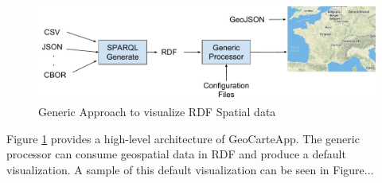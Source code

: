 \documentclass[a4paper,pagenum,english]{rnti}
\begin{document}
\begin{figure}
\includegraphics[scale=0.6]{img/generic_approach.pdf}
\caption{Generic Approach to visualize RDF Spatial data}
\label{fig:generic}
\end{figure}
Figure \ref{fig:generic} provides a high-level architecture of GeoCarteApp. The generic processor can consume geospatial data in RDF and produce a default visualization. A sample of this default visualization can be seen in Figure... 
\end{document}

